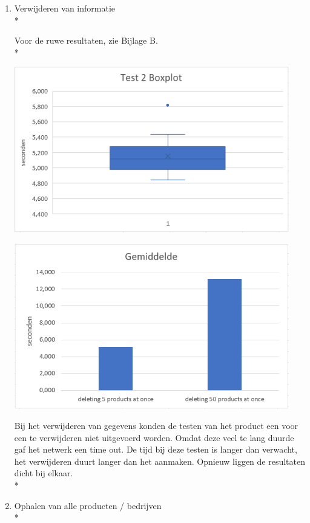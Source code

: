 \documentclass[fleqn,a4paper,12pt]{book}
\begin{document}
\begin{enumerate}
		
	\item Verwijderen van informatie\\*
	
		 Voor de ruwe resultaten, zie Bijlage B.\\*
		
		\begin{center}
			\includegraphics[width=12cm]{img/test-box-2}\\[1cm]
		\end{center}\begin{center}
			\includegraphics[width=12cm]{img/test-column-2}\\[1cm]
		\end{center}
		Bij het verwijderen van gegevens konden de testen van het product een voor een te verwijderen niet uitgevoerd worden. Omdat deze veel te lang duurde gaf het netwerk een time out. De tijd bij deze testen is langer dan verwacht, het verwijderen duurt langer dan het aanmaken. Opnieuw liggen de resultaten dicht bij elkaar.\\*
	
	\item Ophalen van alle producten / bedrijven\\*


\end{enumerate}
\end{document}
